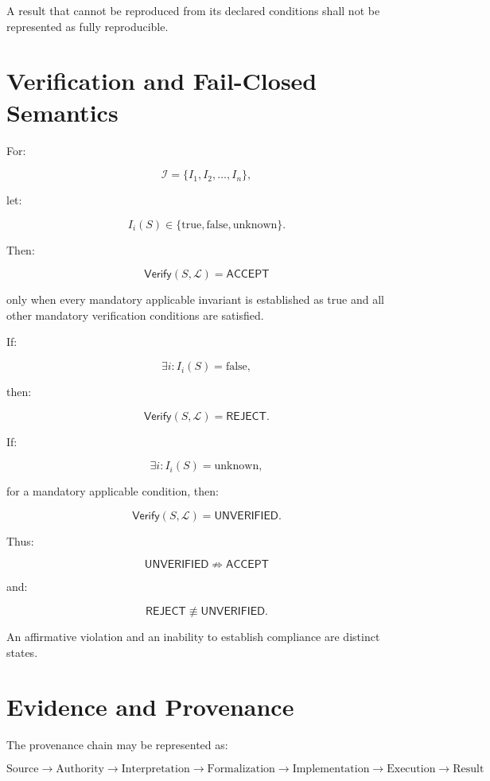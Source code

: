 \documentclass[11pt]{article}
\newcommand{\Inv}{\mathcal{I}}
\newcommand{\Law}{\mathcal{L}}
\newcommand{\Verify}{\mathsf{Verify}}
\newcommand{\Accept}{\mathsf{ACCEPT}}
\newcommand{\Reject}{\mathsf{REJECT}}
\newcommand{\Unknown}{\mathsf{UNVERIFIED}}
\begin{document}
A result that cannot be reproduced from its declared conditions
shall not be represented as fully reproducible.

\section{Verification and Fail-Closed Semantics}

For:

\[
\Inv=\{I_1,I_2,\ldots,I_n\},
\]

let:

\[
I_i(S)\in
\{
\mathrm{true},
\mathrm{false},
\mathrm{unknown}
\}.
\]

Then:

\[
\boxed{
\Verify(S,\Law)=\Accept
}
\]

only when every mandatory applicable invariant is established as
true and all other mandatory verification conditions are
satisfied.

If:

\[
\exists i:
I_i(S)=\mathrm{false},
\]

then:

\[
\boxed{
\Verify(S,\Law)=\Reject.
}
\]

If:

\[
\exists i:
I_i(S)=\mathrm{unknown},
\]

for a mandatory applicable condition, then:

\[
\boxed{
\Verify(S,\Law)=\Unknown.
}
\]

Thus:

\[
\boxed{
\Unknown\not\Rightarrow\Accept
}
\]

and:

\[
\boxed{
\Reject\not\equiv\Unknown.
}
\]

An affirmative violation and an inability to establish
compliance are distinct states.

\section{Evidence and Provenance}

The provenance chain may be represented as:

\[
\boxed{
\text{Source}
\rightarrow
\text{Authority}
\rightarrow
\text{Interpretation}
\rightarrow
\text{Formalization}
\rightarrow
\text{Implementation}
\rightarrow
\text{Execution}
\rightarrow
\text{Result}
}
\]
\end{document}
